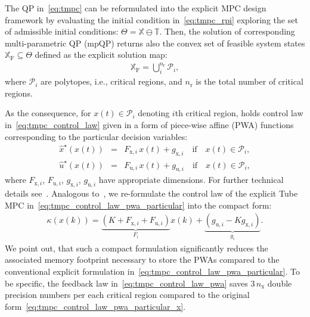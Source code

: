 \documentclass[letterpaper, 10 pt, conference]{ieeeconf}
\begin{document}
The QP in~\eqref{eq:tmpc} can be reformulated into the explicit MPC design framework by evaluating the initial condition in~\eqref{eq:tmpc_rpi} exploring the set of admissible initial conditions: $\Theta = \mathbb{X} \ominus \mathbb{T}$. Then, the solution of corresponding multi-parametric QP (mpQP) returns also the convex set of feasible system states $\mathbb{X}_{\mathrm{F}} \subseteq \Theta$ defined as the explicit solution map:
\begin{eqnarray}
	\label{eq:tmpc_partition}
	\mathbb{X}_{\mathrm{F}} = \bigcup_{i}^{n_{\mathrm{r}}} \mathcal{P}_{i} ,
\end{eqnarray}
where $\mathcal{P}_{i}$ are polytopes, i.e., critical regions, and $n_{\mathrm{r}}$ is the total number of critical regions.

As the consequence, for $x(t) \in \mathcal{P}_{i}$ denoting $i$th critical region, holds control law in~\eqref{eq:tmpc_control_law} given in a form of
piece-wise affine (PWA) functions corresponding to the particular decision variables:
\begin{subequations}
	\label{eq:tmpc_control_law_pwa_particular}
	\begin{eqnarray}
		\label{eq:tmpc_control_law_pwa_particular_x}
		\hat{x}^{\star}(x(t)) \!\!\!\!&=&\!\!\!\! F_{\mathrm{x},i} \, x(t) + g_{\mathrm{x},i} \quad \text{if} \quad x(t) \in \mathcal{P}_{i}, \\
		\label{eq:tmpc_control_law_pwa_particular_u}
		\hat{u}^{\star}(x(t)) \!\!\!\!&=&\!\!\!\! F_{\mathrm{u},i} \, x(t) + g_{\mathrm{u},i} \quad \text{if} \quad x(t) \in \mathcal{P}_{i},
	\end{eqnarray}
\end{subequations}
where $F_{\mathrm{x},i}$, $F_{\mathrm{u},i}$, $g_{\mathrm{x},i}$, $g_{\mathrm{u},i}$ have appropriate dimensions. For further technical details see~\cite{BM02}. 
Analogous to~\cite{ZT14}, we re-formulate the control law of the explicit Tube MPC in~\eqref{eq:tmpc_control_law_pwa_particular} into the compact form:
\begin{eqnarray}
	\label{eq:tmpc_control_law_pwa}
	\kappa(x(k)) = \underbrace{ \left( K + F_{\mathrm{x},i} + F_{\mathrm{u},i} \right) }_{ F_{i} } x(k) + \underbrace{ \left( g_{\mathrm{u},i} - K g_{\mathrm{x},i} \right) }_{ g_{i} }.
\end{eqnarray}
We point out, that such a compact formulation significantly reduces the associated memory footprint necessary to store the PWAs compared to the conventional explicit formulation in~\eqref{eq:tmpc_control_law_pwa_particular}.  
%
To be specific, the feedback law in~\eqref{eq:tmpc_control_law_pwa} saves $3\,n_\text{x}$ double precision numbers per each critical region compared to the original form~\eqref{eq:tmpc_control_law_pwa_particular_x}.
%
\end{document}
